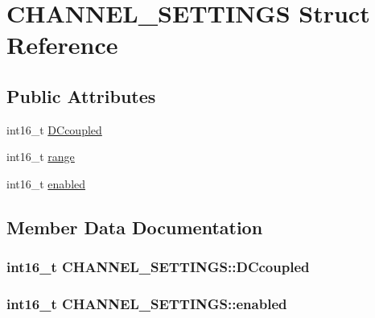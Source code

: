 \hypertarget{structCHANNEL__SETTINGS}{}\section{C\+H\+A\+N\+N\+E\+L\+\_\+\+S\+E\+T\+T\+I\+N\+GS Struct Reference}
\label{structCHANNEL__SETTINGS}
\subsection*{Public Attributes}
\begin{DoxyCompactItemize}
\item 
int16\+\_\+t \hyperlink{structCHANNEL__SETTINGS_af0033a8d5f24c411c9f4e17a1f260aee}{D\+Ccoupled}
\item 
int16\+\_\+t \hyperlink{structCHANNEL__SETTINGS_a52292e91349f85b64a30d069d19f8eab}{range}
\item 
int16\+\_\+t \hyperlink{structCHANNEL__SETTINGS_a802628c830f9eab1fafbb4002ff48b15}{enabled}
\end{DoxyCompactItemize}


\subsection{Member Data Documentation}
\subsubsection[{\texorpdfstring{D\+Ccoupled}{DCcoupled}}]{\setlength{\rightskip}{0pt plus 5cm}int16\+\_\+t C\+H\+A\+N\+N\+E\+L\+\_\+\+S\+E\+T\+T\+I\+N\+G\+S\+::\+D\+Ccoupled}\hypertarget{structCHANNEL__SETTINGS_af0033a8d5f24c411c9f4e17a1f260aee}{}\label{structCHANNEL__SETTINGS_af0033a8d5f24c411c9f4e17a1f260aee}
\subsubsection[{\texorpdfstring{enabled}{enabled}}]{\setlength{\rightskip}{0pt plus 5cm}int16\+\_\+t C\+H\+A\+N\+N\+E\+L\+\_\+\+S\+E\+T\+T\+I\+N\+G\+S\+::enabled}\hypertarget{structCHANNEL__SETTINGS_a802628c830f9eab1fafbb4002ff48b15}{}\label{structCHANNEL__SETTINGS_a802628c830f9eab1fafbb4002ff48b15}
